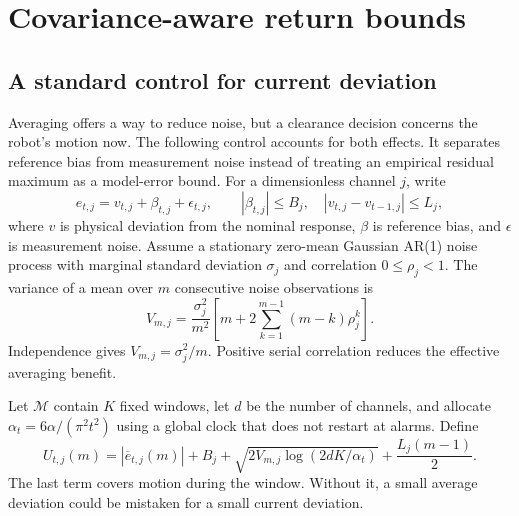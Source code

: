 \section{Covariance-aware return bounds}\label{sec:window}
\subsection{A standard control for current deviation}
Averaging offers a way to reduce noise, but a clearance decision concerns the robot's motion now. The following control accounts for both effects. It separates reference bias from measurement noise instead of treating an empirical residual maximum as a model-error bound. For a dimensionless channel $j$, write
\begin{equation}
 e_{t,j}=v_{t,j}+\beta_{t,j}+\epsilon_{t,j},
 \qquad |\beta_{t,j}|\le B_j,\quad |v_{t,j}-v_{t-1,j}|\le L_j,
 \label{eq:decomposition}
\end{equation}
where $v$ is physical deviation from the nominal response, $\beta$ is reference bias, and $\epsilon$ is measurement noise. Assume a stationary zero-mean Gaussian AR(1) noise process with marginal standard deviation $\sigma_j$ and correlation $0\le\rho_j<1$. The variance of a mean over $m$ consecutive noise observations is
\begin{equation}
 V_{m,j}=\frac{\sigma_j^2}{m^2}
 \left[m+2\sum_{k=1}^{m-1}(m-k)\rho_j^k\right].
 \label{eq:covariance}
\end{equation}
Independence gives $V_{m,j}=\sigma_j^2/m$. Positive serial correlation reduces the effective averaging benefit.

Let $\mathcal M$ contain $K$ fixed windows, let $d$ be the number of channels, and allocate $\alpha_t=6\alpha/(\pi^2t^2)$ using a global clock that does not restart at alarms. Define
\begin{equation}
 U_{t,j}(m)=|\overline e_{t,j}(m)|+B_j
 +\sqrt{2V_{m,j}\log(2dK/\alpha_t)}
 +\frac{L_j(m-1)}{2}.
 \label{eq:windowbound}
\end{equation}
The last term covers motion during the window. Without it, a small average deviation could be mistaken for a small current deviation.

